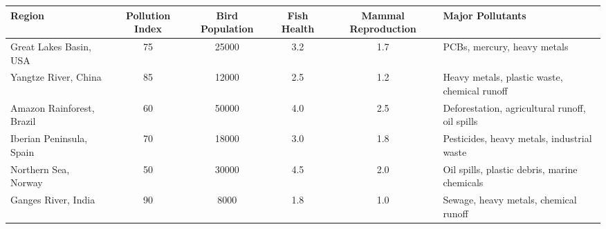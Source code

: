 \documentclass[border=10pt]{standalone}
\begin{document}
\begin{tabular}{>{\raggedright\arraybackslash}p{2.8cm}S[table-format=2.0]S[table-format=5.0]S[table-format=1.1]S[table-format=1.1]p{3cm}}
\toprule
{}
\textbf{Region} & {\textbf{Pollution Index}} & {\textbf{Bird Population}} & {\textbf{Fish Health}} & {\textbf{Mammal Reproduction}} & \textbf{Major Pollutants} \\
\midrule
Great Lakes Basin, USA & 75 & 25000 & 3.2 & 1.7 & PCBs, mercury, heavy metals \\
Yangtze River, China & 85 & 12000 & 2.5 & 1.2 & Heavy metals, plastic waste, chemical runoff \\
Amazon Rainforest, Brazil & 60 & 50000 & 4.0 & 2.5 & Deforestation, agricultural runoff, oil spills \\
Iberian Peninsula, Spain & 70 & 18000 & 3.0 & 1.8 & Pesticides, heavy metals, industrial waste \\
Northern Sea, Norway & 50 & 30000 & 4.5 & 2.0 & Oil spills, plastic debris, marine chemicals \\
Ganges River, India & 90 & 8000 & 1.8 & 1.0 & Sewage, heavy metals, chemical runoff \\
\bottomrule
\end{tabular}
\end{document}
